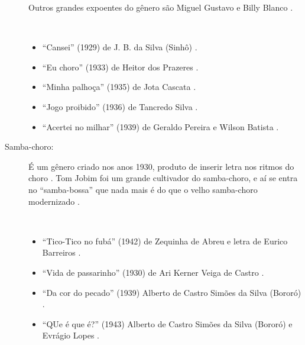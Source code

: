 \begin{description}
Outros grandes expoentes do gênero são Miguel Gustavo e Billy Blanco \cite[pp. 291]{dourado2004dicionario}.

\begin{example} ~

\begin{itemize}
\item ``Cansei'' (1929) de J. B. da Silva (Sinhô) \cite{rizzi2016musica} \cite{aguiar2013reis}.
\item ``Eu choro'' (1933) de Heitor dos Prazeres  \cite[pp. 291]{dourado2004dicionario}.
\item ``Minha palhoça'' (1935) de Jota Cascata \cite{aguiar2013reis}.
\item ``Jogo proibido'' (1936) de Tancredo Silva \cite{rizzi2016musica}.
\item ``Acertei no milhar'' (1939) de Geraldo Pereira e Wilson Batista \cite[pp. 129]{perna2002samba}.
\end{itemize}
\end{example}



\item[Samba-choro:] 
É um gênero criado nos anos 1930, produto de inserir letra nos ritmos do choro \cite[pp. 291]{dourado2004dicionario}.
Tom Jobim foi um grande cultivador do samba-choro, 
e aí se entra no ``samba-bossa'' que nada mais é do que o velho samba-choro modernizado \cite[pp. 63]{reinato2010musica}.
\begin{example} ~

\begin{itemize}
\item ``Tico-Tico no fubá'' (1942) de Zequinha de Abreu e letra de Eurico Barreiros \cite[pp. 6]{marcondes1998enciclopedia} \cite[pp. 39,91]{diniz2003almanaque}.
\item ``Vida de passarinho'' (1930) de Ari Kerner Veiga de Castro  \cite[pp. 291]{dourado2004dicionario}.
\item ``Da cor do pecado'' (1939) Alberto de Castro Simões da Silva (Bororó) \cite[pp. 105]{marcondes1977enciclopedia}.
\item ``QUe é que é?''  (1943) Alberto de Castro Simões da Silva (Bororó) e Evrágio Lopes \cite[pp. 105]{marcondes1977enciclopedia}.
\end{itemize}
\end{example}



\end{description}
